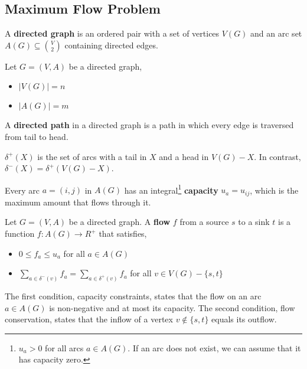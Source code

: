 	\subsection{Maximum Flow Problem}
	\begin{defn}
		A \textbf{directed graph} is an ordered pair with a set of vertices $V(G)$ and an arc set $A(G) \subseteq \binom{V}{2}$ containing directed edges.
	\end{defn}

	\begin{marginfigure}
		Let $G = (V,A)$ be a directed graph,
		\begin{itemize}
			\item $|V(G)| = n$
			\item $|A(G)| = m$
		\end{itemize}
	\end{marginfigure}

	\begin{defn}
		A \textbf{directed path} in a directed graph is a path in which every edge is traversed from tail to head.
	\end{defn}

	\begin{defn}
		$\delta^+(X)$ is the set of arcs with a tail in $X$ and a head in $V(G) - X$. In contrast, $\delta^-(X) = \delta^+(V(G)-X)$.
	\end{defn}

	\begin{defn}[Capacity]
		Every arc $a = (i,j)$ in $A(G)$ has an integral\footnote{$u_a > 0$ for all arcs $a \in A(G)$. If an arc does not exist, we can assume that it has capacity zero.} \textbf{capacity} $u_a = u_{ij}$, which is the maximum amount that flows through it.
	\end{defn}

	\begin{defn}[Flow]
		Let $G = (V,A)$ be a directed graph. A \textbf{flow} $f$ from a source $s$ to a sink $t$ is a function $f: A(G) \rightarrow R^+$ that satisfies,
		\begin{itemize}
			\item $0 \leq f_a \leq u_a$ for all $a \in A(G)$
			\item $\sum_{a \in \delta^-(v)} f_a = \sum_{a \in \delta^+(v)} f_a$ for all $v \in V(G) - \{s,t\}$
		\end{itemize}
		\noindent The first condition, capacity constraints, states that the flow on an arc $a \in A(G)$ is non-negative and at most its capacity. The second condition, flow conservation, states that the inflow of a vertex $v \not\in \{s,t\}$ equals its outflow.
	\end{defn}

